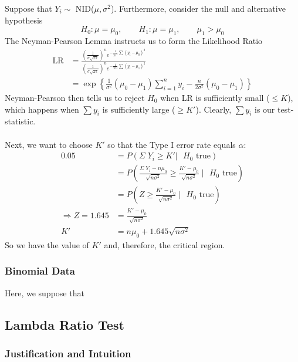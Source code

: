\documentclass[a4paper,12pt]{scrartcl}
\begin{document}
Suppose that $Y_i \sim$ NID($\mu, \sigma^2$). Furthermore, consider 
the null and alternative hypothesis
   \[ H_0: \mu = \mu_0, \qquad H_1: \mu = \mu_1, \qquad \mu_1 > \mu_0 \]
The Neyman-Pearson Lemma instructs us to form the Likelihood Ratio
\begin{align*}
   \text{LR} &= \frac{ \left(\frac{1}{\sigma \sqrt{2\pi}}\right)^n
      e^{-\frac{1}{2\sigma^2} \sum (y_i - \mu_0)^2}}{
      \left(\frac{1}{\sigma \sqrt{2\pi}}\right)^n
      e^{-\frac{1}{2\sigma^2} \sum (y_i - \mu_1)^2}}\\
   &= \exp\left\{\frac{1}{\sigma^2}(\mu_0 - \mu_1) \sum^n_{i=1} y_i - 
	 \frac{n}{2\sigma^2}\left(
      \mu_0 - \mu_1\right)\right\}
\end{align*}
Neyman-Pearson then 
tells us to reject $H_0$ when LR is sufficiently small
($\leq K$), which happens when $\sum y_i$ is sufficiently large 
($\geq K'$). Clearly, $\sum y_i$ is our test-statistic.
\\
\\
Next, we want to choose $K'$ so that the Type I error rate equals
$\alpha$:
\begin{align*}
   0.05 &= P(\Sigma\; Y_i \geq K' | \text{ $H_0$ true}) \\
   &= P\left( \frac{ \Sigma \; Y_i - n \mu_0}{\sqrt{n\sigma^2}}
      \geq \frac{K' - \mu_0}{\sqrt{n\sigma^2}} \; \rvert 
      \text{ $H_0$ true}\right) \\
   &= P\left( Z \geq \frac{K' - \mu_0}{\sqrt{n\sigma^2}} \; \rvert 
      \text{ $H_0$ true}\right) \\
   \Rightarrow Z = 1.645 &= \frac{K' - \mu_0}{\sqrt{n\sigma^2}} \\
   K' &= n\mu_0 + 1.645 \sqrt{n\sigma^2}
\end{align*}
So we have the value of $K'$ and, therefore, the critical region.

\newpage
\subsubsection{Binomial Data}

Here, we suppose that 

\newpage
\subsection{Lambda Ratio Test}

\subsubsection{Justification and Intuition}
\end{document}
